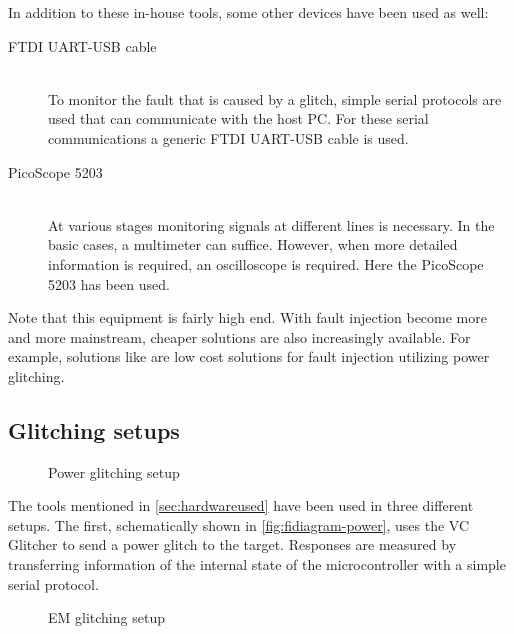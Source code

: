 \documentclass[10pt]{article}
\begin{document}
    \noindent In addition to these in-house tools, some other devices have been used as well:

    \begin{description}
    \item[FTDI UART-USB cable] \ \\
    To monitor the fault that is caused by a glitch, simple serial protocols are used that can communicate with the host PC. 
    For these serial communications a generic FTDI UART-USB cable is used. 

    \item[PicoScope 5203] \ \\
    At various stages monitoring signals at different lines is necessary. In the basic cases, a multimeter can suffice. However, when more detailed information is required, an oscilloscope is required. Here the PicoScope 5203 has been used. 
    \end{description}

    \noindent Note that this equipment is fairly high end. With fault injection become more and more mainstream, cheaper solutions are also increasingly available. For example, solutions like \citet{chipwhisperer} are low cost solutions for fault injection utilizing power glitching.

  \subsection{Glitching setups }

    \begin{figure}[H]
      \centering
      \def\svgwidth{\columnwidth}
      
      \caption{Power glitching setup}
      \label{fig:fidiagram-power}
    \end{figure}

    The tools mentioned in \autoref{sec:hardwareused} have been used in three different setups. The first, schematically shown in \autoref{fig:fidiagram-power}, uses the VC Glitcher to send a power glitch to the target. Responses are measured by transferring information of the internal state of the microcontroller with a simple serial protocol. 

    \begin{figure}[H]
    \centering
    \def\svgwidth{\columnwidth}
    
    \caption{EM glitching setup}
    \label{fig:fidiagram-em}
    \end{figure}
\end{document}

